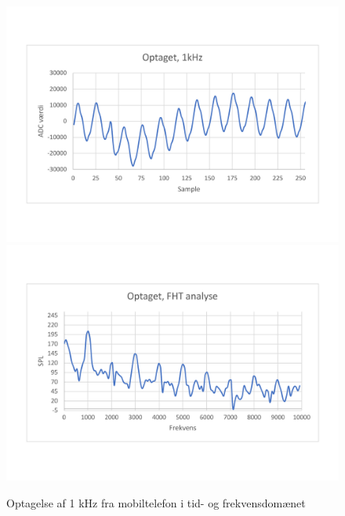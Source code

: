 \begin{figure}[H] 
	\begin{center}
		\includegraphics[width=.45\linewidth, trim={0, 2.5cm, 1.8cm, 0}, clip]{Figur/rec_time_plot.pdf}\quad\includegraphics[width=.45\linewidth, trim={1.8cm, 2.5cm, 0cm, 0}, clip]{Figur/rec_FHT_plot}\quad
		\caption{Optagelse af 1 kHz fra mobiltelefon i tid- og frekvensdomænet }
		\label{fig:rec_plot}
	\end{center}
\end{figure}
